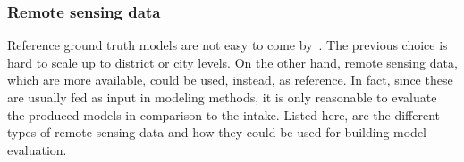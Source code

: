         \subsubsection{Remote sensing data}
            Reference ground truth models are not easy to come by~\parencite{schuster2003new}.
            The previous choice is hard to scale up to district or city levels.
            On the other hand, remote sensing data, which are more available, could be used, instead, as reference.
            In fact, since these are usually fed as input in modeling methods, it is only reasonable to evaluate the produced models in comparison to the intake.
            Listed here, are the different types of remote sensing data and how they could be used for building model evaluation.\\


